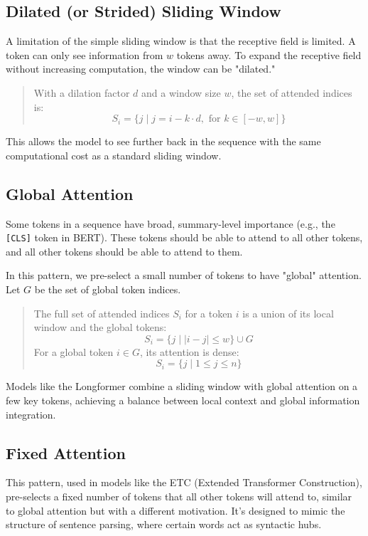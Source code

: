 \documentclass{article}
\begin{document}
\subsection{Dilated (or Strided) Sliding Window}

A limitation of the simple sliding window is that the receptive field is limited. A token can only see information from \(w\) tokens away. To expand the receptive field without increasing computation, the window can be "dilated."
\begin{quote}
With a dilation factor \(d\) and a window size \(w\), the set of attended indices is:
\[
S_i = \{j \mid j = i - k \cdot d, \text{ for } k \in [-w, w] \}
\]
\end{quote}
This allows the model to see further back in the sequence with the same computational cost as a standard sliding window.

\subsection{Global Attention}

Some tokens in a sequence have broad, summary-level importance (e.g., the \texttt{[CLS]} token in BERT). These tokens should be able to attend to all other tokens, and all other tokens should be able to attend to them.

In this pattern, we pre-select a small number of tokens to have "global" attention. Let \(G\) be the set of global token indices.
\begin{quote}
The full set of attended indices \(S_i\) for a token \(i\) is a union of its local window and the global tokens:
\[
S_i = \{j \mid |i - j| \le w \} \cup G
\]
For a global token \(i \in G\), its attention is dense:
\[
S_i = \{j \mid 1 \le j \le n\}
\]
\end{quote}
Models like the Longformer combine a sliding window with global attention on a few key tokens, achieving a balance between local context and global information integration.

\subsection{Fixed Attention}

This pattern, used in models like the ETC (Extended Transformer Construction), pre-selects a fixed number of tokens that all other tokens will attend to, similar to global attention but with a different motivation. It's designed to mimic the structure of sentence parsing, where certain words act as syntactic hubs.
\end{document}
